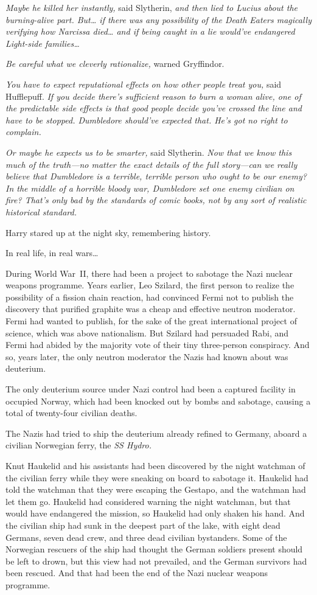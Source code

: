 \emph{Maybe he killed her instantly,} said Slytherin, \emph{and then lied to Lucius about the burning-alive part. But{\ldots} if there was \emph{any} possibility of the Death Eaters magically verifying how Narcissa died{\ldots} and if being caught in a lie would've endangered Light-side families{\ldots}}

\emph{Be careful what we cleverly rationalize,} warned Gryffindor.

\emph{You have to expect reputational effects on how other people treat you,} said Hufflepuff. \emph{If you decide there's sufficient reason to burn a woman alive, one of the predictable side effects is that good people decide you've crossed the line and have to be stopped. Dumbledore should've expected that. He's got no right to complain.}

\emph{Or maybe he expects us to be smarter,} said Slytherin. \emph{Now that we know this much of the truth---no matter the exact details of the full story---can we really believe that Dumbledore is a terrible, terrible person who ought to be our enemy? In the middle of a horrible bloody war, Dumbledore set \emph{one} enemy civilian on fire? That's only bad by the standards of comic books, not by any sort of realistic historical standard.}

Harry stared up at the night sky, remembering history.

In real life, in real wars{\ldots}

During World War~II, there had been a project to sabotage the Nazi nuclear weapons programme. Years earlier, Leo Szilard, the first person to realize the possibility of a fission chain reaction, had convinced Fermi not to publish the discovery that purified graphite was a cheap and effective neutron moderator. Fermi had wanted to publish, for the sake of the great international project of science, which was above nationalism. But Szilard had persuaded Rabi, and Fermi had abided by the majority vote of their tiny three-person conspiracy. And so, years later, the only neutron moderator the Nazis had known about was deuterium.

The only deuterium source under Nazi control had been a captured facility in occupied Norway, which had been knocked out by bombs and sabotage, causing a total of twenty-four civilian deaths.

The Nazis had tried to ship the deuterium already refined to Germany, aboard a civilian Norwegian ferry, the \emph{SS Hydro.}

Knut Haukelid and his assistants had been discovered by the night watchman of the civilian ferry while they were sneaking on board to sabotage it. Haukelid had told the watchman that they were escaping the Gestapo, and the watchman had let them go. Haukelid had considered warning the night watchman, but that would have endangered the mission, so Haukelid had only shaken his hand. And the civilian ship had sunk in the deepest part of the lake, with eight dead Germans, seven dead crew, and three dead civilian bystanders. Some of the Norwegian rescuers of the ship had thought the German soldiers present should be left to drown, but this view had not prevailed, and the German survivors had been rescued. And that had been the end of the Nazi nuclear weapons programme.

